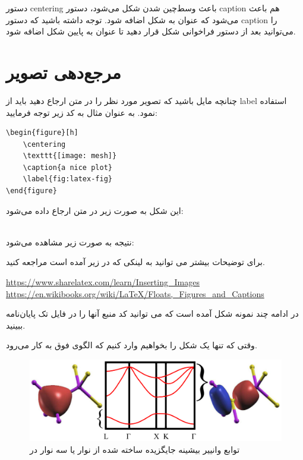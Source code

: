 دستور centering باعث وسط‌چین شدن شکل می‌شود، دستور caption هم باعث می‌شود که عنوان به شکل اضافه شود. توجه داشته باشید که دستور caption را می‌توانید بعد از دستور فراخوانی شکل قرار دهید تا عنوان به پایین شکل اضافه شود.

\section{مرجع‌دهی تصویر}
چنانچه مایل باشید که تصویر مورد نظر را در متن ارجاع دهید باید از label استفاده نمود. به عنوان مثال به کد زیر توجه فرمایید:
\begin{latin}
\begin{lstlisting}[style=Tex]
\begin{figure}[h]
    \centering
    \texttt{[image: mesh]}
    \caption{a nice plot}
    \label{fig:latex-fig}
\end{figure}
\end{lstlisting}
\end{latin}

این شکل به صورت زیر در متن ارجاع داده می‌شود:

\\
نتیجه به صورت زیر مشاهده می‌شود:\\
 
برای توضیحات بیشتر می توانید به لینکی که در زیر آمده است مراجعه کنید.
\begin{latin}
 \url{https://www.sharelatex.com/learn/Inserting\_Images}\\
 \url{https://en.wikibooks.org/wiki/LaTeX/Floats,_Figures_and_Captions}
\end{latin}
 
 در ادامه چند نمونه شکل آمده است که می توانید کد منبع آنها را در فایل تک پایان‌نامه ببینید. 
 
 وقتی که تنها یک شکل را بخواهیم وارد کنیم که الگوی فوق به کار می‌رود. 
 \begin{figure}[ht]
 \centering
 \includegraphics[scale=1.8]{GaAsps}{
\caption{\label{fig:2.2.2}
توابع وانییر بیشینه جایگزیده ساخته شده از نوار  یا سه نوار  در \cite{Marzari2012}
}}
\end{figure}
 
